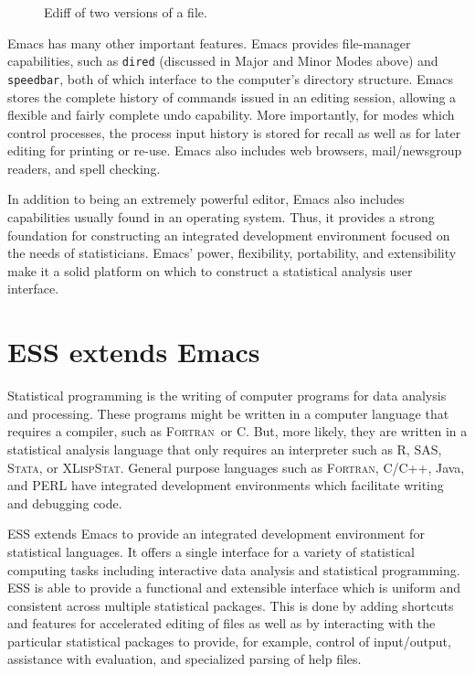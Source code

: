 \documentclass{article}
\def\url#1{\stexttt{#1}} %
\newcommand*{\SAS}{\textsc{SAS}}
\newcommand*{\XLispStat}{\textsc{XLispStat}}
\newcommand*{\Stata}{\textsc{Stata}}
\newcommand*{\Fortran}{\textsc{Fortran}}
\newcommand{\stexttt}[1]{{\small\texttt{#1}}}
\begin{document}
\begin{figure}[tbp]
  \caption{Ediff of two versions of a file.}
  \label{f.ediff}
\end{figure}

Emacs has many other important features.  Emacs provides file-manager
capabilities, such as \stexttt{dired} (discussed in Major and Minor
Modes above) and \stexttt{speedbar}, both of which interface to the
computer's directory structure.  Emacs stores the complete history of
commands issued in an editing session, allowing a flexible and fairly
complete undo capability.  More importantly, for modes which control
processes, the process input history is stored for recall as well as
for later editing for printing or re-use.  Emacs also includes web
browsers, mail/newsgroup readers, and spell checking.

In addition to being an extremely powerful editor, Emacs also
includes capabilities usually found in an operating system.  Thus, it
provides a strong foundation for constructing an integrated
development environment focused on the needs of statisticians.  Emacs'
power, flexibility, portability, and extensibility make it a solid
platform on which to construct a statistical analysis user interface.

\section{ESS extends Emacs}
\label{sec:ess-extends-emacs}

Statistical programming is the writing of computer programs for data
analysis and processing.  These programs might be written in a
computer language that requires a compiler, such as \Fortran\ or C.
But, more likely, they are written in a statistical analysis language
that only requires an interpreter such as R, \SAS, \Stata, or \XLispStat.
General purpose languages such as \Fortran, C/C++, Java, and PERL
have integrated development environments which facilitate writing and
debugging code.

ESS extends Emacs to provide an integrated development environment for
statistical languages.  It offers a single
interface for a variety of statistical computing tasks including
interactive data analysis and statistical programming.
ESS is able to provide a functional and extensible interface
which is uniform and consistent across multiple statistical packages.
This is done by adding shortcuts and features for accelerated editing
of files as well as by interacting with the particular statistical
packages to provide, for example, control of input/output, assistance
with evaluation, and specialized parsing of help files.
\end{document}
